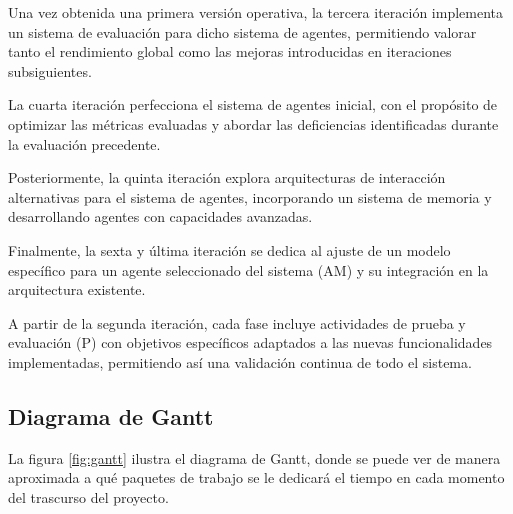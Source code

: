 Una vez obtenida una primera versión operativa, la tercera iteración implementa un sistema de evaluación para dicho sistema de agentes, permitiendo valorar tanto el rendimiento global como las mejoras introducidas en iteraciones subsiguientes.

La cuarta iteración perfecciona el sistema de agentes inicial, con el propósito de optimizar las métricas evaluadas y abordar las deficiencias identificadas durante la evaluación precedente.

Posteriormente, la quinta iteración explora arquitecturas de interacción alternativas para el sistema de agentes, incorporando un sistema de memoria y desarrollando agentes con capacidades avanzadas.

Finalmente, la sexta y última iteración se dedica al ajuste de un modelo específico para un agente seleccionado del sistema (AM) y su integración en la arquitectura existente.

A partir de la segunda iteración, cada fase incluye actividades de prueba y evaluación (P) con objetivos específicos adaptados a las nuevas funcionalidades implementadas, permitiendo así una validación continua de todo el sistema.


\subsection{Diagrama de Gantt}

La figura \ref{fig:gantt} ilustra el diagrama de Gantt, donde se puede ver de manera aproximada a qué paquetes de trabajo se le dedicará el tiempo en cada momento del trascurso del proyecto.



